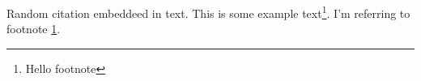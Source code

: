 \documentclass{article}
\begin{document}
Random citation \autocite[1]{DUMMY:1} embeddeed in text.
This is some example text\footnote{\label{myfootnote}Hello footnote}.
I'm referring to footnote \ref{myfootnote}.

\newpage

\printbibliography
\end{document}
